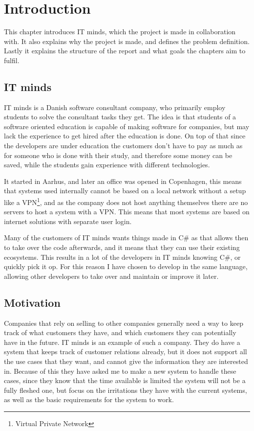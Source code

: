 \chapter{Introduction}
\label{chap:Introduction}
This chapter introduces IT minds, which the project is made in collaboration
with. It also explains why the project is made, and defines the problem
definition. Lastly it explains the structure of the report and what goals the
chapters aim to fulfil. 

\section{IT minds}
\label{sec:IT minds}
IT minds is a Danish software consultant company\cite{IT-minds}, who primarily
employ students to solve the consultant tasks they get. The idea is that
students of a software oriented education is capable of making software for
companies, but may lack the experience to get hired after the education is done.
On top of that since the developers are under education the customers don't have
to pay as much as for someone who is done with their study, and therefore some
money can be saved, while the students gain experience with different technologies. 

It started in Aarhus, and later an office was opened in Copenhagen, this means
that systems used internally cannot be based on a local network without a setup
like a VPN\footnote{Virtual Private Network}, and as the company does not host
anything themselves there are no servers to host a system with a VPN. This means
that most systems are based on internet solutions with separate user login. 

Many of the customers of IT minds wants things made in C\# as that allows then
to take over the code afterwards, and it means that they can use their existing
ecosystems. This results in a lot of the developers in IT minds knowing C\#,
or quickly pick it op. For this reason I have chosen to develop in the same
language, allowing other developers to take over and maintain or improve it later. 

\section{Motivation}
\label{sec:Motivation}
Companies that rely on selling to other companies generally need a way to keep
track of what customers they have, and which customers they can potentially have
in the future. IT minds is an example of such a company. They do have a system
that keeps track of customer relations already, but it does not support all the
use cases that they want, and cannot give the information they are interested
in. Because of this they have asked me to make a new system to handle these
cases, since they know that the time available is limited the system will
not be a fully fleshed one, but focus on the irritations they have with the
current systems, as well as the basic requirements for the system to work. 

